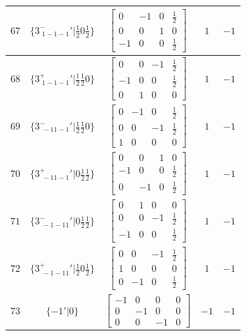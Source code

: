 \documentclass[fleqn,8pt]{jsarticle}
\begin{document}
\begin{longtable}{ccccc}
$ 67 $ & $ \{3^{-}_{\,\,1-1-1}{}'|\frac{1}{2} 0 \frac{1}{2}\} $ & $ \begin{bmatrix} 0 & -1 & 0 & \frac{1}{2} \\ 0 & 0 & 1 & 0 \\ -1 & 0 & 0 & \frac{1}{2} \end{bmatrix} $ & $ 1 $ & $ -1 $ \\ \hline
$ 68 $ & $ \{3^{+}_{\,\,1-1-1}{}'|\frac{1}{2} \frac{1}{2} 0\} $ & $ \begin{bmatrix} 0 & 0 & -1 & \frac{1}{2} \\ -1 & 0 & 0 & \frac{1}{2} \\ 0 & 1 & 0 & 0 \end{bmatrix} $ & $ 1 $ & $ -1 $ \\ \hline
$ 69 $ & $ \{3^{-}_{\,\,-11-1}{}'|\frac{1}{2} \frac{1}{2} 0\} $ & $ \begin{bmatrix} 0 & -1 & 0 & \frac{1}{2} \\ 0 & 0 & -1 & \frac{1}{2} \\ 1 & 0 & 0 & 0 \end{bmatrix} $ & $ 1 $ & $ -1 $ \\ \hline
$ 70 $ & $ \{3^{+}_{\,\,-11-1}{}'|0 \frac{1}{2} \frac{1}{2}\} $ & $ \begin{bmatrix} 0 & 0 & 1 & 0 \\ -1 & 0 & 0 & \frac{1}{2} \\ 0 & -1 & 0 & \frac{1}{2} \end{bmatrix} $ & $ 1 $ & $ -1 $ \\ \hline
$ 71 $ & $ \{3^{-}_{\,\,-1-11}{}'|0 \frac{1}{2} \frac{1}{2}\} $ & $ \begin{bmatrix} 0 & 1 & 0 & 0 \\ 0 & 0 & -1 & \frac{1}{2} \\ -1 & 0 & 0 & \frac{1}{2} \end{bmatrix} $ & $ 1 $ & $ -1 $ \\ \hline
$ 72 $ & $ \{3^{+}_{\,\,-1-11}{}'|\frac{1}{2} 0 \frac{1}{2}\} $ & $ \begin{bmatrix} 0 & 0 & -1 & \frac{1}{2} \\ 1 & 0 & 0 & 0 \\ 0 & -1 & 0 & \frac{1}{2} \end{bmatrix} $ & $ 1 $ & $ -1 $ \\ \hline
$ 73 $ & $ \{-1{}'|0\} $ & $ \begin{bmatrix} -1 & 0 & 0 & 0 \\ 0 & -1 & 0 & 0 \\ 0 & 0 & -1 & 0 \end{bmatrix} $ & $ -1 $ & $ -1 $ \\ \hline

\end{longtable}
\end{document}
